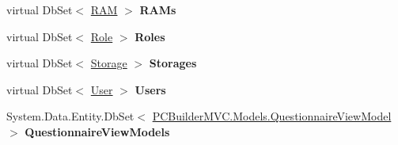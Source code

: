 \begin{DoxyCompactItemize}
\item 
virtual Db\+Set$<$ \hyperlink{class_p_c_builder_m_v_c_1_1_models_1_1_r_a_m}{R\+AM} $>$ {\bfseries R\+A\+Ms}\hypertarget{class_p_c_builder_m_v_c_1_1_models_1_1_p_c_builder_entity_models_aa58a925658f5db1a2451cdb6a0d57949}{}\label{class_p_c_builder_m_v_c_1_1_models_1_1_p_c_builder_entity_models_aa58a925658f5db1a2451cdb6a0d57949}

\item 
virtual Db\+Set$<$ \hyperlink{class_p_c_builder_m_v_c_1_1_models_1_1_role}{Role} $>$ {\bfseries Roles}\hypertarget{class_p_c_builder_m_v_c_1_1_models_1_1_p_c_builder_entity_models_ab650b1da81b3077e41abe4ef3e0777cb}{}\label{class_p_c_builder_m_v_c_1_1_models_1_1_p_c_builder_entity_models_ab650b1da81b3077e41abe4ef3e0777cb}

\item 
virtual Db\+Set$<$ \hyperlink{class_p_c_builder_m_v_c_1_1_models_1_1_storage}{Storage} $>$ {\bfseries Storages}\hypertarget{class_p_c_builder_m_v_c_1_1_models_1_1_p_c_builder_entity_models_a79853744639305e4b275548629834558}{}\label{class_p_c_builder_m_v_c_1_1_models_1_1_p_c_builder_entity_models_a79853744639305e4b275548629834558}

\item 
virtual Db\+Set$<$ \hyperlink{class_p_c_builder_m_v_c_1_1_models_1_1_user}{User} $>$ {\bfseries Users}\hypertarget{class_p_c_builder_m_v_c_1_1_models_1_1_p_c_builder_entity_models_a78925feeeef3b89318953daddeedc6ab}{}\label{class_p_c_builder_m_v_c_1_1_models_1_1_p_c_builder_entity_models_a78925feeeef3b89318953daddeedc6ab}

\item 
System.\+Data.\+Entity.\+Db\+Set$<$ \hyperlink{class_p_c_builder_m_v_c_1_1_models_1_1_questionnaire_view_model}{P\+C\+Builder\+M\+V\+C.\+Models.\+Questionnaire\+View\+Model} $>$ {\bfseries Questionnaire\+View\+Models}\hypertarget{class_p_c_builder_m_v_c_1_1_models_1_1_p_c_builder_entity_models_ada46bb5ef5120abffefa3ce38be5843a}{}\label{class_p_c_builder_m_v_c_1_1_models_1_1_p_c_builder_entity_models_ada46bb5ef5120abffefa3ce38be5843a}


\end{DoxyCompactItemize}
